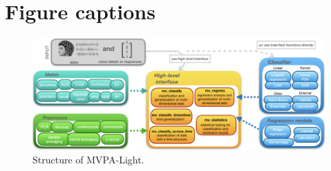 \documentclass[utf8]{frontiersSCNS} %
\begin{document}



\section*{Figure captions}



\begin{figure}[ht!]
\centering\includegraphics[width=\linewidth]{fig1_MVPA_structure}
\caption{Structure of MVPA-Light.}\label{fig:structure}
\end{figure}
\end{document}
